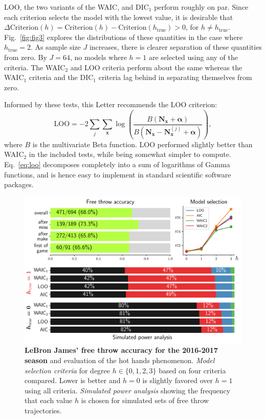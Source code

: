 \documentclass[prl,twocolumn,groupedaddress]{revtex4-1}
\newcommand{\bN}{\mathbf{N}}
\newcommand{\bx}{\mathbf{x}}
\newcommand{\balpha}{{\boldsymbol\alpha}}
\begin{document}
LOO, the two variants of the WAIC,  and DIC$_1$ perform roughly on par. Since each criterion selects the model with the lowest value, it is desirable that $\Delta\textrm{Criterion}(h)=\textrm{Criterion}(h)-\textrm{Criterion}(h_{\textrm{true}})>0$, for $h\neq h_{\textrm{true}}$. Fig.~\ref{fig:fig3} explores the distributions of these quantities in the case where $h_{\textrm{true}}=2$.  As sample size $J$ increases, there is clearer separation of these quantities from zero. By $J=64$, no models where $h=1$ are selected using any of the criteria. The WAIC$_2$ and LOO criteria perform about the same whereas the WAIC$_1$ criteria and the DIC$_1$ criteria lag behind in separating themselves from zero.


Informed by these tests, this Letter recommends the LOO criterion:
\begin{equation}
\textrm{LOO} = -2\sum_j \sum_{\bx}  \log\left(  \frac{B(\bN_\bx  +\balpha)}{B(\bN_\bx -\bN_{\bx}^{(j)} +\balpha)} \right),
\label{eq:loo}
\end{equation}
where $B$ is the multivariate Beta function. LOO performed slightly better than WAIC$_2$ in the included tests, while being somewhat simpler to compute. Eq.~\ref{eq:loo} decomposes completely into a sum of logarithms of Gamma functions, and is hence easy to implement in standard scientific software packages.

\begin{figure}
\includegraphics[width=\linewidth]{fig4}
\caption{\textbf{LeBron James' free throw accuracy for the 2016-2017 season} and evaluation of the hot hands phenomenon. \emph{Model selection criteria} for degree $h\in\{0,1,2,3\}$ based on four criteria compared. Lower is better and $h=0$ is slightly favored over $h=1$ using all criteria. \emph{Simulated power analysis} showing the frequency that each value $h$ is chosen for simulated sets of free throw trajectories. }
\label{fig:freethrows}
\end{figure}
\end{document}
